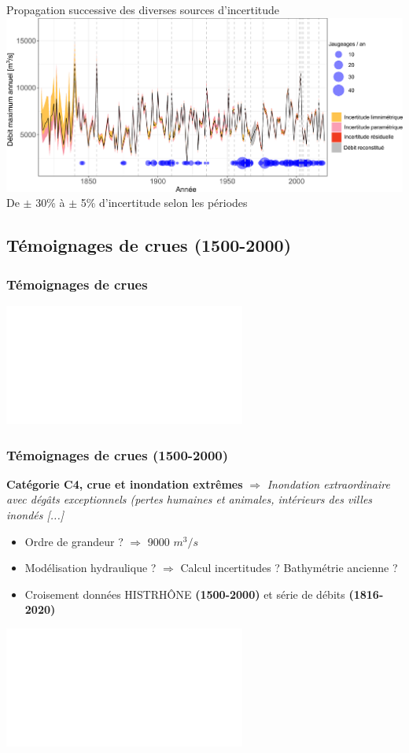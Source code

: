 \documentclass[compress,9pt]{beamer}
\begin{document}
\begin{frame}
\begin{minipage}{0.2\textwidth}
		\end{minipage}
		\hfill
		\begin{minipage}{0.78\textwidth}
			\centering
			Propagation successive des diverses sources d'incertitude\\
			\vspace{10pt}
			\includegraphics[width = \textwidth]{./Figures/uQ.pdf} 
			\centering
			\vspace{10pt}
			De $\pm$ 30\% à $\pm$ 5\% d'incertitude selon les périodes
		\end{minipage}
	\end{frame}	
		
	\subsection{Témoignages de crues (1500-2000)}
	\begin{frame}
		\frametitle{Témoignages de crues}
		\centering
		\includegraphics<1>[width = .6\textwidth]{./Figures/HistoFloods2.pdf} 		
	\end{frame}		
	
	\begin{frame}[t]
		\frametitle{Témoignages de crues (1500-2000)}
		\vfill
		\textbf{Catégorie C4, crue et inondation
extrêmes} $\Rightarrow$ \og \textit{Inondation extraordinaire avec dégâts exceptionnels (pertes humaines et animales, intérieurs des villes inondés [...]}\fg{}  
	\vfill
		\begin{itemize}
			\item<2->[$\vartriangleright$] Ordre de grandeur ? \citet{pichard_hydro-climatology_2017} $\Rightarrow$ 9000 $m^3/s$ 
			\item<3->[$\vartriangleright$] Modélisation hydraulique ? $\Rightarrow$ Calcul incertitudes ? Bathymétrie ancienne ?
			\item<4->[$\vartriangleright$] Croisement données HISTRHÔNE \textbf{(1500-2000)} et série de débits  \textbf{(1816-2020)}
		\end{itemize}
		\vfill
		\centering
		\includegraphics<5>[width = .75\textwidth]{./Figures/C4_SystematicPeriod-FR.pdf} 	
	\end{frame}		
		
\end{document}
